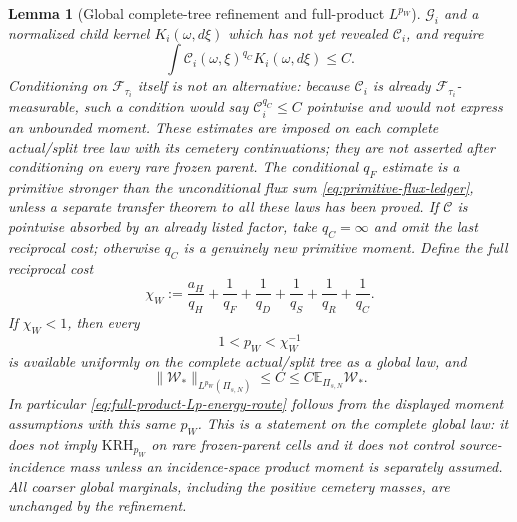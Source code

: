 \documentclass[11pt]{article}
\newtheorem{lemma}[theorem]{Lemma}
\begin{document}
\begin{lemma}[Global complete-tree refinement and full-product $L^{p_W}$]
$\mathcal G_i$ and a normalized child kernel $K_i(\omega,d\xi)$ which has not
yet revealed $\mathcal C_i$, and require
\begin{equation}
\label{eq:parent-kernel-cemetery-moment}
 \int \mathcal C_i(\omega,\xi)^{q_C}K_i(\omega,d\xi)\le C.
\end{equation}
Conditioning on $\mathcal F_{\tau_i}$ itself is not an alternative: because
$\mathcal C_i$ is already $\mathcal F_{\tau_i}$-measurable, such a condition
would say $\mathcal C_i^{q_C}\le C$ pointwise and would not express an
unbounded moment.  These estimates are imposed on each complete
actual/split tree law with its cemetery continuations; they are not asserted
after conditioning on every rare frozen parent.  The conditional
$q_F$ estimate is a primitive stronger than the unconditional flux sum
\eqref{eq:primitive-flux-ledger}, unless a separate transfer theorem to all
these laws has been proved.  If $\mathcal C$ is pointwise absorbed by an
already listed factor, take $q_C=\infty$ and omit the last reciprocal cost;
otherwise $q_C$ is a genuinely new primitive moment.
Define the full reciprocal cost
\begin{equation}
\label{eq:full-product-reciprocal-cost}
 \chi_W:=\frac{a_H}{q_H}+\frac1{q_F}+\frac1{q_D}
       +\frac1{q_S}+\frac1{q_R}+\frac1{q_C}.
\end{equation}
If $\chi_W<1$, then every
\begin{equation}
\label{eq:available-full-product-pW}
 1<p_W<\chi_W^{-1}
\end{equation}
is available uniformly on the complete actual/split tree as a global law,
and
\begin{equation}
\label{eq:proved-full-product-Lp}
 \|\mathscr W_*\|_{L^{p_W}(\Pi_{s,N})}
 \le C\le C\mathbb E_{\Pi_{s,N}}\mathscr W_*.
\end{equation}
In particular \eqref{eq:full-product-Lp-energy-route} follows from the
displayed moment assumptions with this same $p_W$.  This is a statement on
the complete global law: it does not imply \(\mathrm{KRH}_{p_W}\) on rare
frozen-parent cells and it does not control source-incidence mass unless an
incidence-space product moment is separately assumed.  All coarser global
marginals, including the positive cemetery masses, are unchanged by the
refinement.
\end{lemma}
\end{document}
